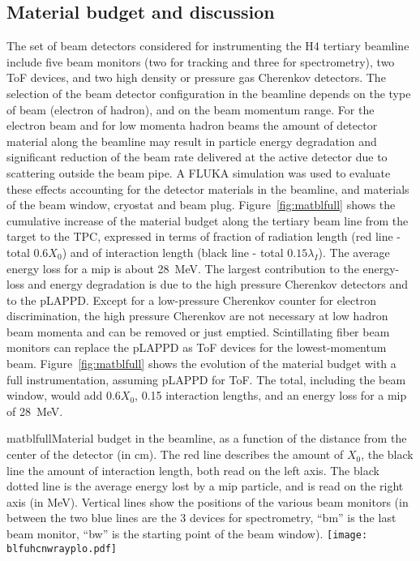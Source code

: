 \subsection{Material budget and discussion}
\label{beam-material-budget}
The set of beam detectors considered for instrumenting the H4 tertiary beamline include
 five beam monitors (two for tracking and three for spectrometry), two ToF devices, and two high density or pressure gas Cherenkov detectors. The selection of the beam detector configuration in the beamline depends on the type of beam (electron of hadron), and on the beam momentum range. For the electron beam and for low momenta hadron beams the amount of detector material along the beamline may result in particle energy degradation and significant reduction of the beam rate delivered at the active detector due to scattering outside the beam pipe. A FLUKA\cite{fluka05,Fluka15} simulation was used to evaluate these effects accounting for the 
 detector materials in the beamline, and materials of the beam window, cryostat and beam plug. Figure~\ref{fig:matblfull} shows the cumulative increase of the material budget along the tertiary beam line from the target to the TPC, expressed in terms of fraction of radiation length (red line - total  $0.6X_0$) and of interaction length (black line - total  $0.15 \lambda_I$). The average energy loss for a mip is about 28~MeV.
 The largest contribution to the energy-loss and energy degradation is due to the high pressure Cherenkov detectors and to the pLAPPD. Except for a low-pressure Cherenkov counter for electron discrimination, the high pressure Cherenkov are not necessary at low hadron beam momenta  and can be removed or just emptied. Scintillating fiber beam monitors can replace the pLAPPD as ToF devices for the lowest-momentum beam. 
  Figure~\ref{fig:matblfull} shows the evolution of the material budget with a full instrumentation, assuming pLAPPD for ToF. The total, including the beam window, would add $0.6X_0$, 0.15 interaction lengths, and an energy loss for a mip of 28~MeV.
 \begin{cdrfigure}{matblfull}{Material budget in the beamline, as a function of the distance from the center of the detector (in cm). The red line describes the amount of $X_0$, the black line the amount of interaction length, both read on the left axis. The black dotted line is the average energy lost by a mip particle, and is read on the right axis (in MeV). Vertical lines show the positions of the various beam monitors (in between the two blue lines are the 3 devices for spectrometry, ``bm'' is the last beam monitor, ``bw'' is the starting point of the beam window).}  
\texttt{[image: blfuhcnwrayplo.pdf]}
\end{cdrfigure}
 
